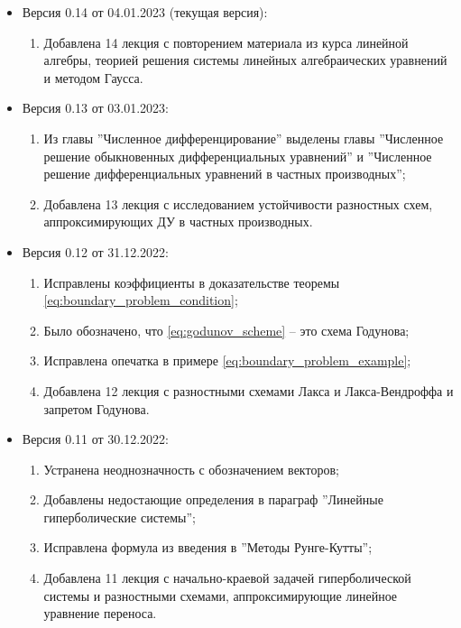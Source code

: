 \documentclass{article}
\begin{document}

\begin{itemize}[nosep]
\item Версия 0.14 от 04.01.2023 (текущая версия):
	\begin{enumerate}[nosep]
		\item Добавлена 14 лекция с повторением материала из курса
			линейной алгебры, теорией решения системы линейных
			алгебраических уравнений и методом Гаусса.
	\end{enumerate}
\item Версия 0.13 от 03.01.2023:
	\begin{enumerate}[nosep]
		\item Из главы ''Численное дифференцирование'' выделены главы
			''Численное решение обыкновенных дифференциальных
			уравнений'' и ''Численное решение дифференциальных
			уравнений в частных производных'';
		\item Добавлена 13 лекция с исследованием устойчивости
			разностных схем, аппроксимирующих ДУ в частных
			производных.
	\end{enumerate}
\item Версия 0.12 от 31.12.2022:
	\begin{enumerate}[nosep]
		\item Исправлены коэффициенты в доказательстве теоремы
			\eqref{eq:boundary_problem_condition};
		\item Было обозначено, что \eqref{eq:godunov_scheme} -- это
			схема Годунова;
		\item Исправлена опечатка в примере
			\eqref{eq:boundary_problem_example};
		\item Добавлена 12 лекция с разностными схемами Лакса и
			Лакса-Вендроффа и запретом Годунова.
	\end{enumerate}

\item Версия 0.11 от 30.12.2022:
	\begin{enumerate}[nosep]
		\item Устранена неоднозначность с обозначением векторов;
		\item Добавлены недостающие определения в параграф
			''Линейные гиперболические системы'';
		\item Исправлена формула из введения в ''Методы Рунге-Кутты'';
		\item Добавлена 11 лекция с начально-краевой задачей
			гиперболической системы и разностными схемами,
			аппроксимирующие линейное уравнение переноса.
	\end{enumerate}


\end{itemize}
\end{document}
